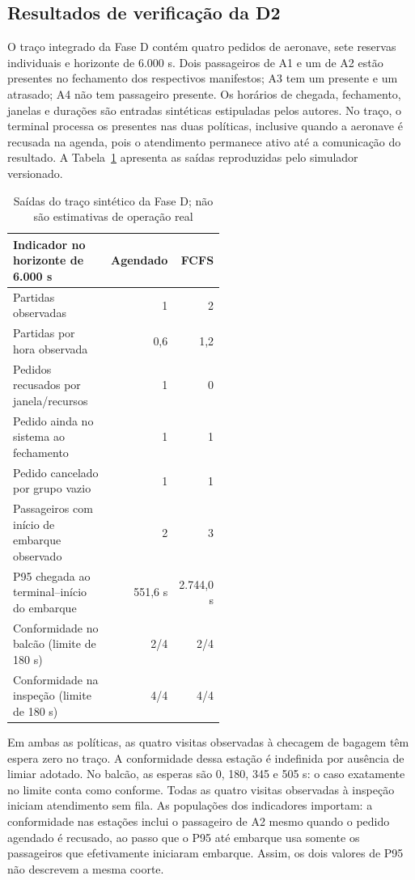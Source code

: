\subsection{Resultados de verificação da D2}

O traço integrado da Fase D contém quatro pedidos de aeronave, sete reservas individuais e horizonte de 6.000 s. Dois passageiros de A1 e um de A2 estão presentes no fechamento dos respectivos manifestos; A3 tem um presente e um atrasado; A4 não tem passageiro presente. Os horários de chegada, fechamento, janelas e durações são entradas sintéticas estipuladas pelos autores. No traço, o terminal processa os presentes nas duas políticas, inclusive quando a aeronave é recusada na agenda, pois o atendimento permanece ativo até a comunicação do resultado. A Tabela~\ref{tab:trace} apresenta as saídas reproduzidas pelo simulador versionado.

\begin{table}[htbp]
\centering\small
\caption{Saídas do traço sintético da Fase D; não são estimativas de operação real}
\label{tab:trace}
\begin{tabular}{@{}p{0.52\linewidth}rr@{}}
\toprule
Indicador no horizonte de 6.000 s & Agendado & FCFS \\
\midrule
Partidas observadas & 1 & 2 \\
Partidas por hora observada & 0,6 & 1,2 \\
Pedidos recusados por janela/recursos & 1 & 0 \\
Pedido ainda no sistema ao fechamento & 1 & 1 \\
Pedido cancelado por grupo vazio & 1 & 1 \\
Passageiros com início de embarque observado & 2 & 3 \\
P95 chegada ao terminal--início do embarque & 551,6 s & 2.744,0 s \\
Conformidade no balcão (limite de 180 s) & 2/4 & 2/4 \\
Conformidade na inspeção (limite de 180 s) & 4/4 & 4/4 \\
\bottomrule
\end{tabular}
\end{table}

Em ambas as políticas, as quatro visitas observadas à checagem de bagagem têm espera zero no traço. A conformidade dessa estação é indefinida por ausência de limiar adotado. No balcão, as esperas são 0, 180, 345 e 505 s: o caso exatamente no limite conta como conforme. Todas as quatro visitas observadas à inspeção iniciam atendimento sem fila. As populações dos indicadores importam: a conformidade nas estações inclui o passageiro de A2 mesmo quando o pedido agendado é recusado, ao passo que o P95 até embarque usa somente os passageiros que efetivamente iniciaram embarque. Assim, os dois valores de P95 não descrevem a mesma coorte.


